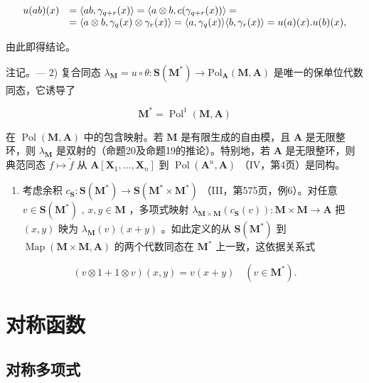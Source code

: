 \[
\begin{array}{r l} u (a b) (x) & = \langle a b, \gamma_ {q + r} (x) \rangle = \langle a \otimes b, c (\gamma_ {q + r} (x)) \rangle = \\ & = \langle a \otimes b, \gamma_ {q} (x) \otimes \gamma_ {r} (x) \rangle = \langle a, \gamma_ {q} (x) \rangle \langle b, \gamma_ {r} (x) \rangle = u (a) (x). u (b) (x), \end{array}
\]

由此即得结论。

注记。--- 2) 复合同态 \(\lambda_{\mathbf{M}}=u\circ\theta:\mathbf{S}(\mathbf{M}^{*})\to\mathrm{Pol}_{\mathbf{A}}(\mathbf{M},\mathbf{A})\) 是唯一的保单位代数同态，它诱导了

\[
\mathbf {M} ^ {*} = \operatorname{Pol} ^ {1} (\mathbf {M}, \mathbf {A})
\]

在 \(\operatorname{Pol}(\mathbf{M}, \mathbf{A})\) 中的包含映射。若 \(\mathbf{M}\) 是有限生成的自由模，且 \(\mathbf{A}\) 是无限整环，则 \(\lambda_{\mathbf{M}}\) 是双射的（命题20及命题19的推论）。特别地，若 \(\mathbf{A}\) 是无限整环，则典范同态 \(f \mapsto \tilde{f}\) 从 \(\mathbf{A}[\mathbf{X}_1, \ldots, \mathbf{X}_n]\) 到 \(\operatorname{Pol}(\mathbf{A}^n, \mathbf{A})\) （IV，第4页）是同构。

\begin{enumerate}
\def\labelenumi{\arabic{enumi})}
\setcounter{enumi}{2}
\tightlist
\item
  考虑余积 \(c_{\mathbf{S}}: \mathbf{S}(\mathbf{M}^{*}) \to \mathbf{S}(\mathbf{M}^{*} \times \mathbf{M}^{*})\) （III，第575页，例6）。对任意 \(v \in \mathbf{S}(\mathbf{M}^{*})\) , \(x, y \in \mathbf{M}\) ，多项式映射 \(\lambda_{\mathbf{M} \times \mathbf{M}}(c_{\mathbf{S}}(v)): \mathbf{M} \times \mathbf{M} \to \mathbf{A}\) 把 \((x, y)\) 映为 \(\lambda_{\mathbf{M}}(v)(x + y)\) 。如此定义的从 \(\mathbf{S}(\mathbf{M}^{*})\) 到 \(\operatorname{Map}(\mathbf{M} \times \mathbf{M}, \mathbf{A})\) 的两个代数同态在 \(\mathbf{M}^{*}\) 上一致，这依据关系式
\end{enumerate}

\[
(v \otimes 1 + 1 \otimes v) (x, y) = v (x + y) \quad (v \in \mathbf {M} ^ {*}).
\]

\section{对称函数}

\subsection{对称多项式}

